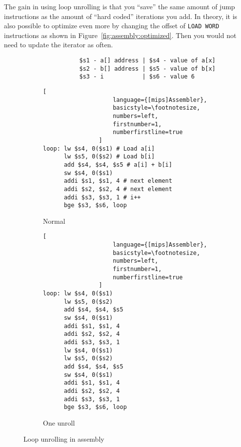 The gain in using loop unrolling is that you \enquote{save} the same amount of jump instructions as the amount of \enquote{hard coded} iterations you add. In theory, it is also possible to optimize even more by changing the offset of \texttt{LOAD WORD} instructions as shown in Figure~\ref{fig:assembly:optimized}. Then you would not need to update the iterator as often.

\begin{figure}
    \centering
    \begin{adjustbox}{minipage=\linewidth,scale=0.8}
        \begin{verbatim}
                $s1 - a[] address | $s4 - value of a[x]
                $s2 - b[] address | $s5 - value of b[x]
                $s3 - i           | $s6 - value 6
        \end{verbatim}
        \begin{subfigure}{.55\textwidth}
            \centering
            \begin{lstlisting}[
                    language={[mips]Assembler},
                    basicstyle=\footnotesize,
                    numbers=left,
                    firstnumber=1,
                    numberfirstline=true
                ]
loop: lw $s4, 0($s1) # Load a[i]
      lw $s5, 0($s2) # Load b[i]
      add $s4, $s4, $s5 # a[i] + b[i]
      sw $s4, 0($s1)
      addi $s1, $s1, 4 # next element
      addi $s2, $s2, 4 # next element
      addi $s3, $s3, 1 # i++
      bge $s3, $s6, loop
                \end{lstlisting}
            \caption{Normal}
            \label{fig:unroll:sub1}
        \end{subfigure}%
        \begin{subfigure}{.3\textwidth}
            \centering
            \begin{lstlisting}[
                    language={[mips]Assembler},
                    basicstyle=\footnotesize,
                    numbers=left,
                    firstnumber=1,
                    numberfirstline=true
                ]
loop: lw $s4, 0($s1)
      lw $s5, 0($s2)
      add $s4, $s4, $s5
      sw $s4, 0($s1)
      addi $s1, $s1, 4
      addi $s2, $s2, 4
      addi $s3, $s3, 1
      lw $s4, 0($s1)
      lw $s5, 0($s2)
      add $s4, $s4, $s5
      sw $s4, 0($s1)
      addi $s1, $s1, 4
      addi $s2, $s2, 4
      addi $s3, $s3, 1
      bge $s3, $s6, loop
                \end{lstlisting}
            \caption{One unroll}
            \label{fig:unroll:sub2}
        \end{subfigure}
    \end{adjustbox}
    \caption{Loop unrolling in assembly}
    \label{fig:assembly:unroll}
\end{figure}


